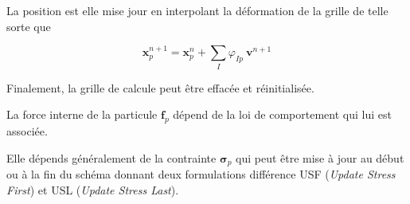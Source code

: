 La position est elle mise jour en interpolant la déformation de la grille de telle sorte que

\begin{equation*}
    \bm x_p^{n+1} = \bm x_p^{n} + \sum_I \varphi_{Ip}~\bm v^{n+1}
\end{equation*}

Finalement, la grille de calcule peut être effacée et réinitialisée.

La force interne de la particule $\bm f_p$ dépend de la loi de comportement qui lui est associée.

Elle dépends généralement de la contrainte $\bm \sigma_p$ qui peut être mise à jour au début ou à la fin du schéma donnant deux formulations différence USF (\textit{Update Stress First}) et USL (\textit{Update Stress Last}).